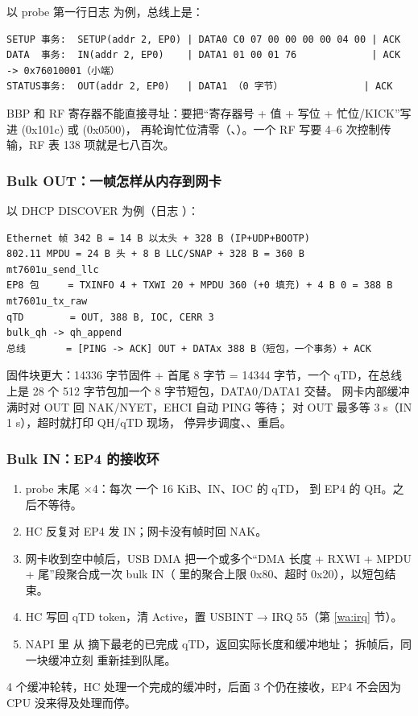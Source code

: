 以 probe 第一行日志  为例，总线上是：
\begin{lstlisting}
SETUP 事务:  SETUP(addr 2, EP0) | DATA0 C0 07 00 00 00 00 04 00 | ACK
DATA  事务:  IN(addr 2, EP0)    | DATA1 01 00 01 76             | ACK     -> 0x76010001（小端）
STATUS事务:  OUT(addr 2, EP0)   | DATA1 （0 字节）              | ACK
\end{lstlisting}
BBP 和 RF 寄存器不能直接寻址：要把“寄存器号 + 值 + 写位 + 忙位/KICK”写进 (0x101c) 或 (0x0500)，
再轮询忙位清零（、）。一个 RF 写要 4--6 次控制传输，RF 表 138 项就是七八百次。

\subsubsection{Bulk OUT：一帧怎样从内存到网卡}

以 DHCP DISCOVER 为例（日志 ）：

\begin{lstlisting}
Ethernet 帧 342 B = 14 B 以太头 + 328 B (IP+UDP+BOOTP)
802.11 MPDU = 24 B 头 + 8 B LLC/SNAP + 328 B = 360 B            mt7601u_send_llc
EP8 包     = TXINFO 4 + TXWI 20 + MPDU 360 (+0 填充) + 4 B 0 = 388 B   mt7601u_tx_raw
qTD        = OUT, 388 B, IOC, CERR 3                            bulk_qh -> qh_append
总线       = [PING -> ACK] OUT + DATAx 388 B（短包，一个事务）+ ACK
\end{lstlisting}

固件块更大：14336 字节固件 + 首尾 8 字节 = 14344 字节，一个 qTD，在总线上是 28 个 512 字节包加一个 8 字节短包，DATA0/DATA1 交替。
网卡内部缓冲满时对 OUT 回 NAK/NYET，EHCI 自动 PING 等待； 对 OUT 最多等 3 s（IN 1 s），超时就打印 QH/qTD 现场，
停异步调度、、重启。

\subsubsection{Bulk IN：EP4 的接收环}

\begin{enumerate}[leftmargin=2em,itemsep=0pt]
\item probe 末尾  ×4：每次  一个 16 KiB、IN、IOC 的 qTD， 到 EP4 的 QH。之后不等待。
\item HC 反复对 EP4 发 IN；网卡没有帧时回 NAK。
\item 网卡收到空中帧后，USB DMA 把一个或多个“DMA 长度 + RXWI + MPDU + 尾”段聚合成一次 bulk IN（ 里的聚合上限 0x80、超时 0x20），以短包结束。
\item HC 写回 qTD token，清 Active，置 USBINT → IRQ 55（第 \ref{wa:irq} 节）。
\item NAPI 里 \allowbreak{} 从  摘下最老的已完成 qTD，返回实际长度和缓冲地址；
   拆帧后，同一块缓冲立刻  重新挂到队尾。
\end{enumerate}
4 个缓冲轮转，HC 处理一个完成的缓冲时，后面 3 个仍在接收，EP4 不会因为 CPU 没来得及处理而停。


